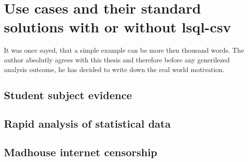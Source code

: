 \chapter{Use cases and their standard solutions with or without lsql-csv}
It was once sayed, that a simple example can be more then thousand words. The author absolutly agrees with this thesis and therefore before any generilezed analysis outcome, he has decided to write down the real world motivation.

\section{Student subject evidence}

\section{Rapid analysis of statistical data}

\section{Madhouse internet censorship}
